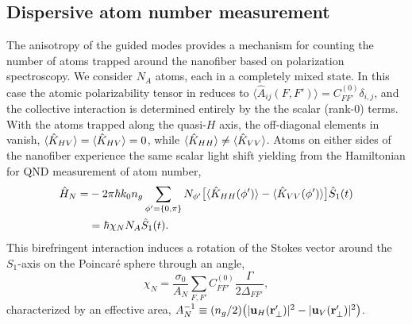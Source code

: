 \documentclass[preprint, aps,pra,onecolumn]{revtex4-1} %
\newcommand{\polcomp}{\hat{K}} %
\newcommand{\chiN}{\chi_{N}}
\newcommand{\Abir}{A_N}
\begin{document}
	\subsection{Dispersive atom number measurement} \label{Sec::AtomNumberMeasurement}

The anisotropy of the guided modes provides a mechanism for counting the number of atoms trapped around the nanofiber based on polarization spectroscopy.  
We consider $N_A$ atoms, each in a completely mixed state. In this case the atomic polarizability tensor in  reduces to $\langle \hat{A}_{ij}(F,F') \rangle = C_{FF'}^{(0)} \delta_{i,j}$, and the collective interaction is determined entirely by the the scalar (rank-0) terms.  
With the atoms trapped along the quasi-$H$ axis, the off-diagonal elements in  vanish, $\expt{ \polcomp_{HV} } = \expt{ \polcomp_{HV} } =0$, while $\expt{ \polcomp_{HH} } \neq  \expt{ \polcomp_{VV} }$.  
Atoms on either sides of the nanofiber experience the same scalar light shift yielding from   the Hamiltonian for QND measurement of atom number,
	\begin{align}
		\hat{H}_{N} =& -2\pi \hbar k_0 n_g \sum_{\phi' = \{0,\pi \}} N_{\phi'} \big[ \expt{ \polcomp_{HH}(\phi')}  - \expt{ \polcomp_{VV}(\phi')} \big] \hat{S}_1(t)  \nonumber \\
		& =  \hbar \chiN N_A \hat{S}_1(t).  \label{Eq::MixedHamiltonian}
	\end{align}	
This birefringent interaction induces a rotation of the Stokes vector  around the $S_1$-axis on the Poincar\'{e} sphere through an angle, 
	\begin{equation} \label{Eq::RotationAngle}
		\chiN = \frac{\sigma_0}{\Abir}  \sum_{F,F'}  C_{FF'}^{(0)} \frac{\Gamma}{2 \Delta_{FF'}},
	\end{equation}
characterized by an effective area, $\Abir^{-1} \equiv (n_g/2) \big( |\mathbf{u}_{H}(\br'_\perp)|^2 - |\mathbf{u}_{V}(\br'_\perp)| ^2 \big)$.   
\end{document}
